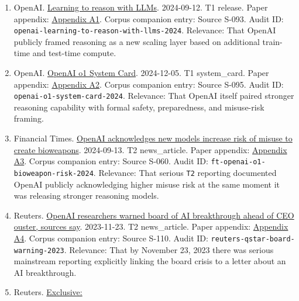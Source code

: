 \documentclass[
  american,
  11pt,
  letterpaper,
]{article}
\providecommand{\tightlist}{%
  \setlength{\itemsep}{0pt}\setlength{\parskip}{0pt}}
\begin{document}
\begin{enumerate}
\def\labelenumi{\arabic{enumi}.}
\tightlist
\item
  OpenAI.
  \href{https://openai.com/index/learning-to-reason-with-llms/}{Learning
  to reason with LLMs}. 2024-09-12. T1 release. Paper appendix:
  \hyperref[ch-06-appendix-a1-learning-to-reason-with-llms]{Appendix
  A1}. Corpus companion entry: Source S-093. Audit ID:
  \texttt{openai-learning-to-reason-with-llms-2024}. Relevance: That
  OpenAI publicly framed reasoning as a new scaling layer based on
  additional train-time and test-time compute.
\item
  OpenAI. \href{https://openai.com/index/openai-o1-system-card/}{OpenAI
  o1 System Card}. 2024-12-05. T1 system\_card. Paper appendix:
  \hyperref[ch-06-appendix-a2-openai-o1-system-card]{Appendix A2}.
  Corpus companion entry: Source S-095. Audit ID:
  \texttt{openai-o1-system-card-2024}. Relevance: That OpenAI itself
  paired stronger reasoning capability with formal safety, preparedness,
  and misuse-risk framing.
\item
  Financial Times.
  \href{https://www.ft.com/content/37ba7236-2a64-4807-b1e1-7e21ee7d0914}{OpenAI
  acknowledges new models increase risk of misuse to create bioweapons}.
  2024-09-13. T2 news\_article. Paper appendix:
  \hyperref[ch-06-appendix-a3-openai-acknowledges-new-models-increase-risk-of-misuse-to-create-bioweapons]{Appendix
  A3}. Corpus companion entry: Source S-060. Audit ID:
  \texttt{ft-openai-o1-bioweapon-risk-2024}. Relevance: That serious
  \texttt{T2} reporting documented OpenAI publicly acknowledging higher
  misuse risk at the same moment it was releasing stronger reasoning
  models.
\item
  Reuters.
  \href{https://www.reuters.com/technology/sam-altmans-ouster-openai-was-precipitated-by-letter-board-about-ai-breakthrough-2023-11-22/}{OpenAI
  researchers warned board of AI breakthrough ahead of CEO ouster,
  sources say}. 2023-11-23. T2 news\_article. Paper appendix:
  \hyperref[ch-06-appendix-a4-openai-researchers-warned-board-of-ai-breakthrough-ahead-of-ceo-ouster-sources-say]{Appendix
  A4}. Corpus companion entry: Source S-110. Audit ID:
  \texttt{reuters-qstar-board-warning-2023}. Relevance: That by November
  23, 2023 there was serious mainstream reporting explicitly linking the
  board crisis to a letter about an AI breakthrough.
\item
  Reuters.
  \href{https://www.reuters.com/technology/artificial-intelligence/openai-working-new-reasoning-technology-under-code-name-strawberry-2024-07-12/}{Exclusive:
}
\end{enumerate}
\end{document}

